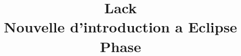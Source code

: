 \documentclass{book}
\begin{document}
 

\title{Lack\\ Nouvelle d'introduction a Eclipse Phase} \date{} 

\maketitle

\begin{mainmatter} 



\end{mainmatter} 
\end{document}
